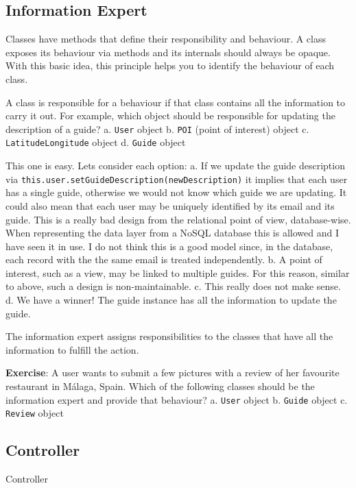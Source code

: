 \documentclass[]{article}
\begin{document}
\subsection{Information Expert}\label{information-expert}

Classes have methods that define their responsibility and behaviour. A
class exposes its behaviour via methods and its internals should always
be opaque. With this basic idea, this principle helps you to identify
the behaviour of each class.

A class is responsible for a behaviour if that class contains all the
information to carry it out. For example, which object should be
responsible for updating the description of a guide? a. \texttt{User}
object b. \texttt{POI} (point of interest) object c.
\texttt{LatitudeLongitude} object d. \texttt{Guide} object

This one is easy. Lets consider each option: a. If we update the guide
description via \texttt{this.user.setGuideDescription(newDescription)}
it implies that each user has a single guide, otherwise we would not
know which guide we are updating. It could also mean that each user may
be uniquely identified by its email and its guide. This is a really bad
design from the relational point of view, database-wise. When
representing the data layer from a NoSQL database this is allowed and I
have seen it in use. I do not think this is a good model since, in the
database, each record with the the same email is treated independently.
b. A point of interest, such as a view, may be linked to multiple
guides. For this reason, similar to above, such a design is
non-maintainable. c. This really does not make sense. d. We have a
winner! The guide instance has all the information to update the guide.

The information expert assigns responsibilities to the classes that have
all the information to fulfill the action.

\textbf{Exercise}: A user wants to submit a few pictures with a review
of her favourite restaurant in Málaga, Spain. Which of the following
classes should be the information expert and provide that behaviour? a.
\texttt{User} object b. \texttt{Guide} object c. \texttt{Review} object

\subsection{Controller}\label{controller}

Controller
\end{document}
